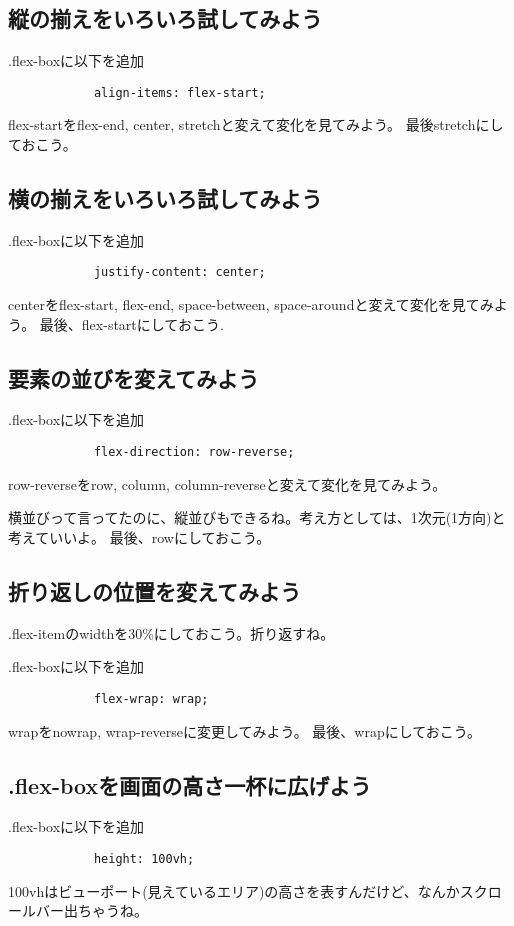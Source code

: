 \documentclass[mingoth,11pt,a4j,uplatex]{jsarticle}
\begin{document}
\subsection{縦の揃えをいろいろ試してみよう}
.flex-boxに以下を追加
\begin{lstlisting}
            align-items: flex-start;
\end{lstlisting}
flex-startをflex-end, center, stretchと変えて変化を見てみよう。
最後stretchにしておこう。

\subsection{横の揃えをいろいろ試してみよう}
.flex-boxに以下を追加
\begin{lstlisting}
            justify-content: center;
\end{lstlisting}
centerをflex-start, flex-end, space-between, space-aroundと変えて変化を見てみよう。
最後、flex-startにしておこう.


\subsection{要素の並びを変えてみよう}
.flex-boxに以下を追加
\begin{lstlisting}
            flex-direction: row-reverse;
\end{lstlisting}
row-reverseをrow, column, column-reverseと変えて変化を見てみよう。

横並びって言ってたのに、縦並びもできるね。考え方としては、1次元(1方向)と考えていいよ。
最後、rowにしておこう。

\subsection{折り返しの位置を変えてみよう}
.flex-itemのwidthを30\%にしておこう。折り返すね。

.flex-boxに以下を追加
\begin{lstlisting}
            flex-wrap: wrap;
\end{lstlisting}
wrapをnowrap, wrap-reverseに変更してみよう。
最後、wrapにしておこう。

\subsection{.flex-boxを画面の高さ一杯に広げよう}
.flex-boxに以下を追加
\begin{lstlisting}
            height: 100vh;
\end{lstlisting}
100vhはビューポート(見えているエリア)の高さを表すんだけど、なんかスクロールバー出ちゃうね。
\end{document}

